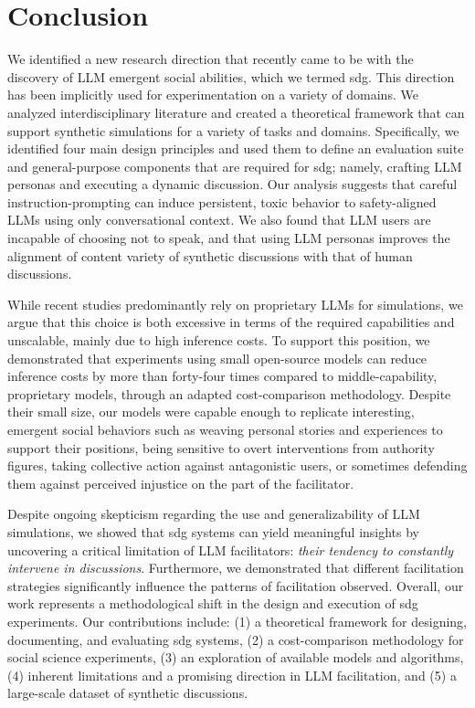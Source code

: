 %

\section{Conclusion}

We identified a new research direction that recently came to be with the discovery of LLM emergent social abilities, which we termed \acf{sdg}. This direction has been implicitly used for experimentation on a variety of domains. We analyzed interdisciplinary literature and created a theoretical framework that can support synthetic simulations for a variety of tasks and domains. Specifically, we identified four main design principles and used them to define an evaluation suite and general-purpose components that are required for \ac{sdg}; namely, crafting LLM personas and executing a dynamic discussion. Our analysis suggests that careful instruction-prompting can induce persistent, toxic behavior to safety-aligned LLMs using only conversational context. We also found that LLM users are incapable of choosing not to speak, and that using LLM personas improves the alignment of content variety of synthetic discussions with that of human discussions. 

While recent studies predominantly rely on proprietary LLMs for simulations, we argue that this choice is both excessive in terms of the required capabilities and unscalable, mainly due to high inference costs. To support this position, we demonstrated that experiments using small open-source models can reduce inference costs by more than forty-four times compared to middle-capability, proprietary models, through an adapted cost-comparison methodology. Despite their small size, our models were capable enough to replicate interesting, emergent social behaviors such as weaving personal stories and experiences to support their positions, being sensitive to overt interventions from authority figures, taking collective action against antagonistic users, or sometimes defending them against perceived injustice on the part of the facilitator.

Despite ongoing skepticism regarding the use and generalizability of LLM simulations, we showed that \ac{sdg} systems can yield meaningful insights by uncovering a critical limitation of LLM facilitators: \emph{their tendency to constantly intervene in discussions}. Furthermore, we demonstrated that different facilitation strategies significantly influence the patterns of facilitation observed. Overall, our work represents a methodological shift in the design and execution of \ac{sdg} experiments. Our contributions include:
(1) a theoretical framework for designing, documenting, and evaluating \ac{sdg} systems,
(2) a cost-comparison methodology for social science experiments,
(3) an exploration of available models and algorithms,
(4) inherent limitations and a promising direction in LLM facilitation, and
(5) a large-scale dataset of synthetic discussions. 


